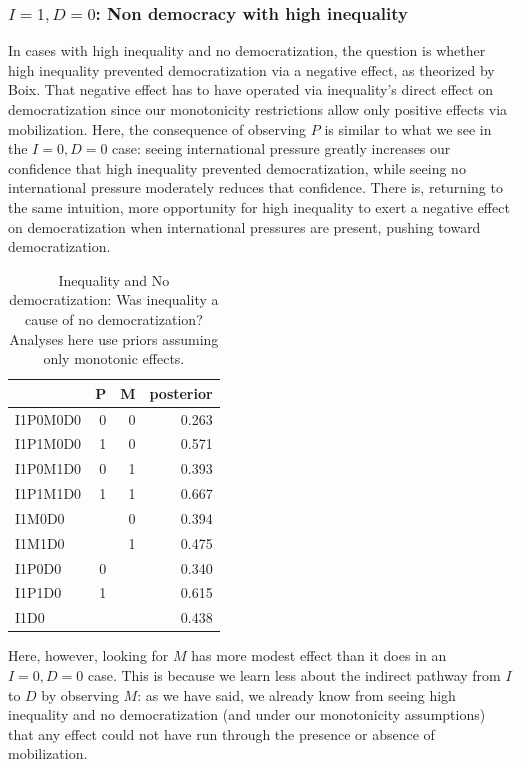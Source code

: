 \documentclass[
  12pt,
]{book}
\begin{document}
\hypertarget{i1-d0-non-democracy-with-high-inequality}{%
\subsubsection{\texorpdfstring{\(I=1, D=0\): Non democracy with high inequality}{I=1, D=0: Non democracy with high inequality}}\label{i1-d0-non-democracy-with-high-inequality}}

In cases with high inequality and no democratization, the question is whether high inequality prevented democratization via a negative effect, as theorized by Boix. That negative effect has to have operated via inequality's direct effect on democratization since our monotonicity restrictions allow only positive effects via mobilization. Here, the consequence of observing \(P\) is similar to what we see in the \(I=0, D=0\) case: seeing international pressure greatly increases our confidence that high inequality prevented democratization, while seeing no international pressure moderately reduces that confidence. There is, returning to the same intuition, more opportunity for high inequality to exert a negative effect on democratization when international pressures are present, pushing toward democratization.

\begin{table}

\caption{\label{tab:Tapp2}Inequality and No democratization: Was inequality a cause of no democratization? Analyses here use priors assuming only monotonic effects.}
\centering
\begin{tabular}[t]{l|r|r|r}
\hline
  & P & M & posterior\\
\hline
I1P0M0D0 & 0 & 0 & 0.263\\
\hline
I1P1M0D0 & 1 & 0 & 0.571\\
\hline
I1P0M1D0 & 0 & 1 & 0.393\\
\hline
I1P1M1D0 & 1 & 1 & 0.667\\
\hline
I1M0D0 &  & 0 & 0.394\\
\hline
I1M1D0 &  & 1 & 0.475\\
\hline
I1P0D0 & 0 &  & 0.340\\
\hline
I1P1D0 & 1 &  & 0.615\\
\hline
I1D0 &  &  & 0.438\\
\hline
\end{tabular}
\end{table}

Here, however, looking for \(M\) has more modest effect than it does in an \(I=0, D=0\) case. This is because we learn less about the indirect pathway from \(I\) to \(D\) by observing \(M\): as we have said, we already know from seeing high inequality and no democratization (and under our monotonicity assumptions) that any effect could not have run through the presence or absence of mobilization.
\end{document}
